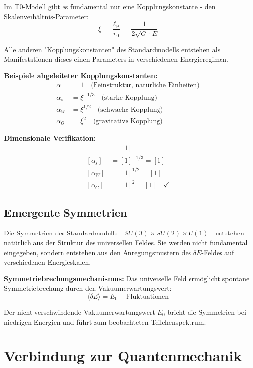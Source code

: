 \documentclass[12pt,a4paper]{report}
\newcommand{\lP}{\ell_{\text{P}}}         %
\newcommand{\rzero}{r_0}                  %
\newcommand{\alphafine}{\alpha}           %
\begin{document}
	Im T0-Modell gibt es fundamental nur eine Kopplungskonstante - den Skalenverhältnis-Parameter:
	\begin{equation}
		\xi = \frac{\lP}{\rzero} = \frac{1}{2\sqrt{G} \cdot E}
	\end{equation}
	
	Alle anderen "Kopplungskonstanten" des Standardmodells entstehen als Manifestationen dieses einen Parameters in verschiedenen Energieregimen.
	
	\textbf{Beispiele abgeleiteter Kopplungskonstanten:}
	\begin{align}
		\alphafine &= 1 \quad \text{(Feinstruktur, natürliche Einheiten)} \\
		\alpha_s &= \xi^{-1/3} \quad \text{(starke Kopplung)} \\
		\alpha_W &= \xi^{1/2} \quad \text{(schwache Kopplung)} \\
		\alpha_G &= \xi^2 \quad \text{(gravitative Kopplung)}
	\end{align}
	
	\textbf{Dimensionale Verifikation:}
	\begin{align}
		[\alphafine] &= [1] \\
		[\alpha_s] &= [1]^{-1/3} = [1] \\
		[\alpha_W] &= [1]^{1/2} = [1] \\
		[\alpha_G] &= [1]^2 = [1] \quad \checkmark
	\end{align}
	
	\subsection{Emergente Symmetrien}
	
	Die Symmetrien des Standardmodells - $SU(3) \times SU(2) \times U(1)$ - entstehen natürlich aus der Struktur des universellen Feldes. Sie werden nicht fundamental eingegeben, sondern entstehen aus den Anregungsmustern des $\delta E$-Feldes auf verschiedenen Energieskalen.
	
	\textbf{Symmetriebrechungsmechanismus:}
	Das universelle Feld ermöglicht spontane Symmetriebrechung durch den Vakuumerwartungswert:
	\begin{equation}
		\langle \delta E \rangle = E_0 + \text{Fluktuationen}
	\end{equation}
	
	Der nicht-verschwindende Vakuumerwartungswert $E_0$ bricht die Symmetrien bei niedrigen Energien und führt zum beobachteten Teilchenspektrum.
	
	\section{Verbindung zur Quantenmechanik}
	
\end{document}
